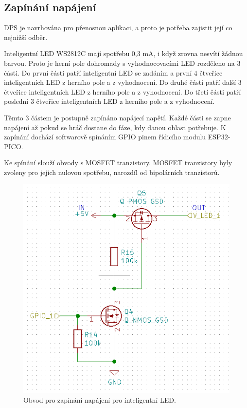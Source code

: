   \subsection{Zapínání napájení}
  DPS je navrhována pro přenosnou aplikaci, a proto je potřeba zajistit její co nejnižší odběr. 

  Inteligentní LED WS2812C mají spotřebu 0,3 mA, i když zrovna nesvítí žádnou barvou. Proto je herní pole dohromady s 
  vyhodnocovacími LED rozděleno na 3 části. Do první části patří inteligentní LED se zadáním a první 4 čtveřice inteligentních LED 
  z herního pole a z vyhodnocení. Do druhé části patří další 3 čtveřice inteligentních LED z herního pole a z vyhodnocení. 
  Do třetí části patří poslední 3 čtveřice inteligentních LED z herního pole a z vyhodnocení.

  Těmto 3 částem je postupně zapínáno napájecí napětí. Každé části se zapne napájení až pokud se hráč dostane do fáze, kdy 
  danou oblast potřebuje. K zapínání dochází softwarově spínáním GPIO pinem řídicího modulu ESP32-PICO.

  Ke spínání slouží obvody s MOSFET tranzistory. MOSFET tranzistory byly zvoleny pro jejich nulovou spotřebu, narozdíl od 
  bipolárních tranzistorů. 

  \begin{figure}[!h]
    \begin{center}
      \includegraphics[scale=0.7]{obrazky/Zapinani_napajeni_LED.png}
    \end{center}
    \caption[Obvod pro zapínání napájení pro inteligentní LED]{Obvod pro zapínání napájení pro inteligentní LED.}
  \end{figure}

